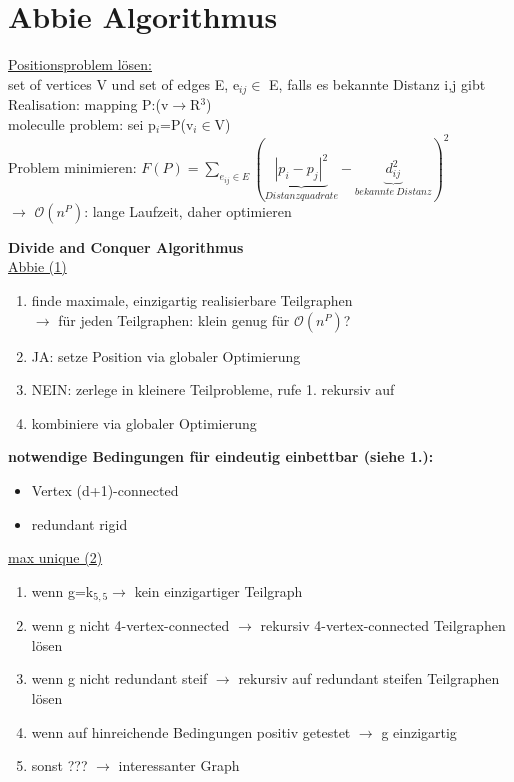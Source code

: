 \documentclass[12pt,a4paper]{article}
\begin{document}
\section{Abbie Algorithmus}

\underline{Positionsproblem lösen:}\\
set of vertices V und set of edges E, e$_{ij} \in$ E, falls es bekannte Distanz i,j gibt\\
Realisation: mapping P:(v$\rightarrow$R$^3$)\\
moleculle problem: sei p$_i$=P(v$_i \in$V)\\
Problem minimieren: $F(P)=\sum \limits_{e_{ij} \in E} (\underbrace{|p_i-p_j|^2}_{Distanzquadrate}-\underbrace{d_{ij}^2}_{bekannte\ Distanz})^2$\\
$\rightarrow$ $\mathcal{O}(n^P)$: lange Laufzeit, daher optimieren

\textbf{Divide and Conquer Algorithmus}\\
\underline{Abbie (1)}
\begin{enumerate}
	\item finde maximale, einzigartig realisierbare Teilgraphen\\ $\rightarrow$ für jeden Teilgraphen: klein genug für $\mathcal{O}(n^P)$?
	\item JA: setze Position via globaler Optimierung
	\item NEIN: zerlege in kleinere Teilprobleme, rufe 1. rekursiv auf
	\item kombiniere via globaler Optimierung
\end{enumerate}

\textbf{notwendige Bedingungen für eindeutig einbettbar (siehe 1.):}
\begin{itemize}
	\item Vertex (d+1)-connected
	\item redundant rigid
\end{itemize}

\underline{max unique (2)}
\begin{enumerate}
	\item wenn g=k$_{5,5} \rightarrow$ kein einzigartiger Teilgraph
	\item wenn g nicht 4-vertex-connected $\rightarrow$ rekursiv 4-vertex-connected Teilgraphen lösen
	\item wenn g nicht redundant steif $\rightarrow$ rekursiv auf redundant steifen Teilgraphen lösen
	\item wenn auf hinreichende Bedingungen positiv getestet $\rightarrow$ g einzigartig
	\item sonst ??? $\rightarrow$ interessanter Graph
\end{enumerate}
\end{document}
